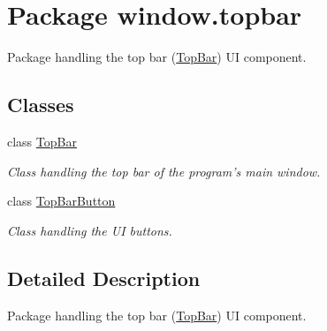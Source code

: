 \hypertarget{namespacewindow_1_1topbar}{\section{Package window.\-topbar}
\label{namespacewindow_1_1topbar}
}


Package handling the top bar (\hyperlink{classwindow_1_1topbar_1_1_top_bar}{Top\-Bar}) U\-I component.  


\subsection*{Classes}
\begin{DoxyCompactItemize}
\item 
class \hyperlink{classwindow_1_1topbar_1_1_top_bar}{Top\-Bar}
\begin{DoxyCompactList}\small\item\em Class handling the top bar of the program's main window. \end{DoxyCompactList}\item 
class \hyperlink{classwindow_1_1topbar_1_1_top_bar_button}{Top\-Bar\-Button}
\begin{DoxyCompactList}\small\item\em Class handling the U\-I buttons. \end{DoxyCompactList}\end{DoxyCompactItemize}


\subsection{Detailed Description}
Package handling the top bar (\hyperlink{classwindow_1_1topbar_1_1_top_bar}{Top\-Bar}) U\-I component. 